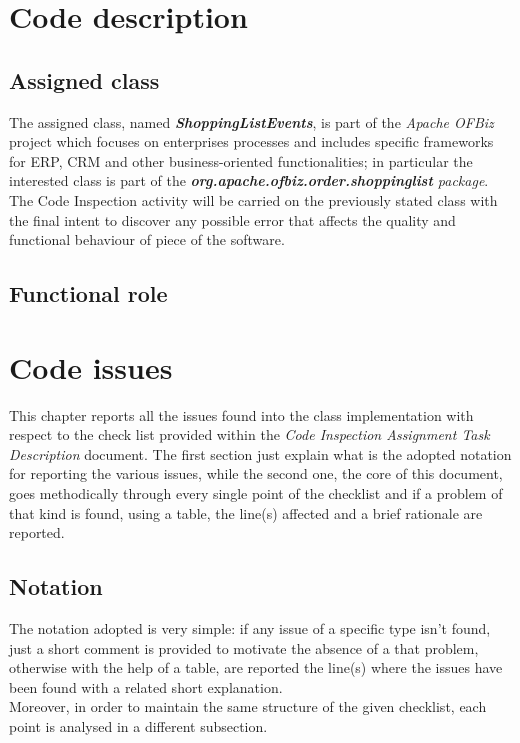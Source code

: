 \documentclass[11pt,a4paper]{report}
\begin{document}


\thispagestyle{empty}
\tableofcontents
\cleardoublepage
{}
\pagestyle{fancy}

\chapter{Code description}
\section{Assigned class}
The assigned class, named \textbf{\textit{ShoppingListEvents}}, is part of the \textit{Apache OFBiz} project which focuses on enterprises processes and includes specific frameworks for ERP, CRM and other business-oriented functionalities;
in particular the interested class is part of the \textit{\textbf{org.apache.ofbiz.order.shoppinglist} package}.\\
The Code Inspection activity will be carried on the previously stated class with the final intent to discover any possible error that affects the quality and functional behaviour of piece of the software.
\section{Functional role}
\chapter{Code issues}
This chapter reports all the issues found into the class implementation with respect to the check list provided within the \textit{Code Inspection Assignment Task Description} document. The first section just explain what is the adopted notation for reporting the various issues, while the second one, the core of this document, goes methodically through every single point of the checklist and if a problem of that kind is found, using a table, the line(s) affected and a brief rationale are reported.
\section{Notation}
The notation adopted is very simple: if any issue of a specific type isn't found, just a short comment is provided to motivate the absence of a that problem, otherwise with the help of a table, are reported the line(s) where the issues have been found with a related short explanation.\\
Moreover, in order to maintain the same structure of the given checklist, each point is analysed in a different subsection.
\end{document}
